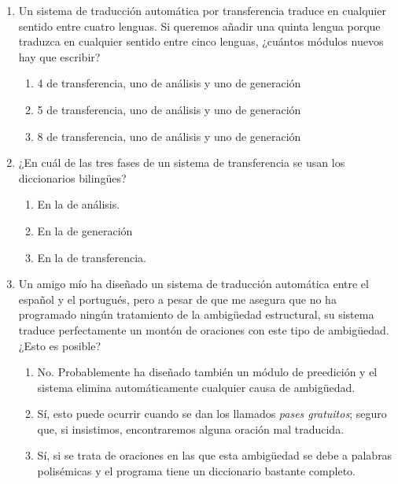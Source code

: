 \begin{enumerate}
\item Un sistema de traducción automática por transferencia traduce en cualquier sentido entre cuatro lenguas. Si queremos añadir una quinta lengua porque traduzca en cualquier sentido entre cinco lenguas, ¿cuántos módulos nuevos hay que escribir? \begin{enumerate} \item 4 de transferencia, uno de análisis y uno de generación \item 5 de transferencia, uno de análisis y uno de generación \item 8 de transferencia, uno de análisis y uno de generación \end{enumerate} 

\item ¿En cuál de las tres fases de un sistema de transferencia se usan los diccionarios bilingües? \begin{enumerate} \item En la de análisis. \item En la de generación \item En la de transferencia. \end{enumerate} 

\item Un amigo mío ha diseñado un sistema de traducción automática entre el español y el portugués, pero a pesar de que me asegura que no ha programado ningún tratamiento de la ambigüedad estructural, su sistema traduce perfectamente un montón de oraciones con este tipo de ambigüedad. ¿Esto es posible? \begin{enumerate} \item No. Probablemente ha diseñado también un módulo de preedición y el sistema elimina automáticamente cualquier causa de ambigüedad. \item Sí, esto puede ocurrir cuando se dan los llamados \emph{pases gratuitos}; seguro que, si insistimos, encontraremos alguna oración mal traducida. \item Sí, si se trata de oraciones en las que esta ambigüedad se debe a palabras polisémicas y el programa tiene un diccionario bastante completo. \end{enumerate} 


\end{enumerate}

